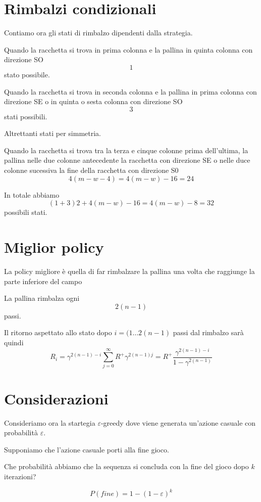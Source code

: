 \documentclass[a4paper,11pt]{article}
\begin{document}
\section{Rimbalzi condizionali}

Contiamo ora gli stati di rimbalzo dipendenti dalla strategia.

Quando la racchetta si trova in prima colonna e la pallina in quinta colonna con direzione SO 
\[
1
\]
stato possibile.

Quando la racchetta si trova in seconda colonna e la pallina in prima colonna con direzione SE o in quinta o sesta colonna con direzione SO
\[
3
\]
stati possibili.

Altrettanti stati per simmetria.

Quando la racchetta si trova tra la terza e cinque colonne prima dell'ultima, la pallina nelle due colonne antecedente la racchetta
con direzione SE o nelle duce colonne sucessiva la fine della racchetta
con direzione S0
\[
4 (m-w-4)=4(m-w)-16=24
\]

In totale abbiamo
\[
(1+3)2+4(m-w)-16=4(m-w)-8=32
\]
possibili stati.

\section{Miglior policy}

La policy migliore è quella di far rimbalzare la pallina una volta che raggiunge la parte inferiore del campo

La pallina rimbalza ogni
\[
2 (n - 1)
\]
passi.

Il ritorno aspettato allo stato dopo $ i = (1 \dots 2(n-1) $ passi dal rimbalzo sarà quindi
\[
R_i = \gamma ^ {2(n-1)-i} \sum_{j=0}^{\infty} R^+ \gamma ^ {2(n-1)j} =
R^+ \frac{ \gamma ^ {2(n-1)-i}}{1-\gamma ^ {2(n-1)}}
\]


\section{Considerazioni}

Consideriamo ora la startegia $ \varepsilon $-greedy dove viene generata un'azione casuale con probabilità $ \varepsilon $.

Supponiamo che l'azione casuale porti alla fine gioco.

Che probabilità abbiamo che la sequenza si concluda con la fine del gioco dopo $ k $ iterazioni?

\[
P(fine) = 1 - (1 - \varepsilon) ^ k
\]
\end{document}
